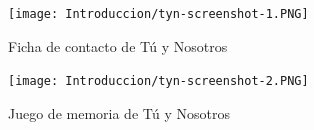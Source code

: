 \vspace{25pt}

\begin{figure}[H]
    \centering
    \begin{minipage}{0.45\textwidth}
        \centering
        \texttt{[image: Introduccion/tyn-screenshot-1.PNG]}
        \caption{Ficha de contacto de Tú y Nosotros}
        \label{fig:tyn-ficha}
    \end{minipage}\hfill
    \begin{minipage}{0.45\textwidth}
        \centering
        \texttt{[image: Introduccion/tyn-screenshot-2.PNG]}
        \caption{Juego de memoria de Tú y Nosotros}
        \label{fig:tyn-memoria}
    \end{minipage}
\end{figure}